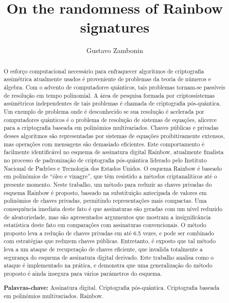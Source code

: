 \documentclass[12pt, a4paper, oneside]{memoir}
\title{On the randomness of Rainbow signatures}
\author{Gustavo Zambonin}
\date{}
\theoremstyle{definition}
\begin{document}
\maketitle

\begin{abstract}
O esforço computacional necessário para enfraquecer algoritmos de criptografia assimétrica atualmente usados é proveniente de problemas da teoria de números e álgebra. Com o advento de computadores quânticos, tais problemas tornam-se passíveis de resolução em tempo polinomial. A área de pesquisa formada por criptossistemas assimétricos independentes de tais problemas é chamada de criptografia pós-quântica. Um exemplo de problema onde é desconhecido se sua resolução é acelerada por computadores quânticos é o problema de resolução de sistemas de equações, alicerce para a criptografia baseada em polinômios multivariados. Chaves públicas e privadas desses algoritmos são representadas por sistemas de equações proibitivamente extensos, mas operações com mensagens são demasiado eficientes. Este comportamento é facilmente identificável no esquema de assinatura digital Rainbow, atualmente finalista no processo de padronização de criptografia pós-quântica liderado pelo Instituto Nacional de Padrões e Tecnologia dos Estados Unidos. O esquema Rainbow é baseado em polinômios de ``óleo e vinagre'', que têm resistido a métodos criptanalíticos até o presente momento. Neste trabalho, um método para reduzir as chaves privadas do esquema Rainbow é proposto, baseado na substituição antecipada de valores em polinômios de chaves privadas, permitindo representações mais compactas. Uma consequência imediata deste fato é que assinaturas são geradas com um nível reduzido de aleatoriedade, mas são apresentados argumentos que mostram a insignificância estatística deste fato em comparações com assinaturas convencionais. O método proposto leva a redução de chaves privadas em até 6.5 vezes, e pode ser combinado com estratégias que reduzem chaves públicas. Entretanto, é exposto que tal método leva a um ataque de recuperação de chaves eficiente, que invalida totalmente a segurança do esquema de assinatura digital derivado. Este trabalho analisa como o ataque é implementado na prática, e demonstra que uma generalização do método proposto é ainda insegura para vários parâmetros do esquema.

\vspace{\baselineskip}
\textbf{Palavras-chave:} Assinatura digital. Criptografia pós-quântica. Criptografia baseada em polinômios multivariados. Rainbow.
\end{abstract}
\end{document}
